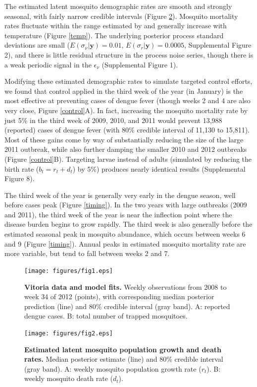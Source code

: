 \documentclass[10pt,letterpaper]{article}
\begin{document}
The estimated latent mosquito demographic rates are smooth and strongly seasonal, with fairly narrow credible intervals (Figure \ref{latent}).
Mosquito mortality rates fluctuate within the range estimated by \cite{Brady2013} and generally increase with temperature (Figure \ref{temp}).
The underlying posterior process standard deviations are small ($E(\sigma_{\nu}|\mathbf{y}) = 0.01$, $E(\sigma_r|\mathbf{y}) = 0.0005$, Supplemental Figure 2), and there is little residual structure in the process noise series, though there is a weak periodic signal in the $\epsilon_{\nu}$ (Supplemental Figure 1).

Modifying these estimated demographic rates to simulate targeted control efforts, we found that control applied in the third week of the year (in January) is the most effective at preventing cases of dengue fever (though weeks 2 and 4 are also very close, Figure \ref{control}A).
In fact, increasing the mosquito mortality rate by just 5\% in the third week of 2009, 2010, and 2011 would prevent 13,988 (reported) cases of dengue fever (with 80\% credible interval of 11,130 to 15,811).
Most of these gains come by way of substantially reducing the size of the large 2011 outbreak, while also further damping the smaller 2010 and 2012 outbreaks (Figure \ref{control}B).
Targeting larvae instead of adults (simulated by reducing the birth rate ($b_t = r_t + d_t$) by 5\%) produces nearly identical results (Supplemental Figure 8).

The third week of the year is generally very early in the dengue season, well before cases peak (Figure \ref{timing}).
In the two years with large outbreaks (2009 and 2011), the third week of the year is near the inflection point where the disease burden begins to grow rapidly.  
The third week is also generally before the estimated seasonal peak in mosquito abundance, which occurs between weeks 6 and 9 (Figure \ref{timing}).
Annual peaks in estimated mosquito mortality rate are more variable, but tend to fall between weeks 2 and 7.

\begin{figure}[!h]
\texttt{[image: figures/fig1.eps]}
\caption{{\bf Vitoria data and model fits.}
Weekly observations from 2008 to week 34 of 2012 (points), with corresponding median posterior prediction (line) and 80\% credible interval (gray band). A: reported dengue cases. B: total number of trapped mosquitoes.
}
\label{timeseries}
\end{figure}

\begin{figure}[!h]
\texttt{[image: figures/fig2.eps]}
\caption{{\bf Estimated latent mosquito population growth and death rates.}
Median posterior estimate (line) and 80\% credible interval (gray band).  A: weekly mosquito population growth rate ($r_t$). B: weekly mosquito death rate ($d_t$).
}
\label{latent}
\end{figure}
\end{document}
